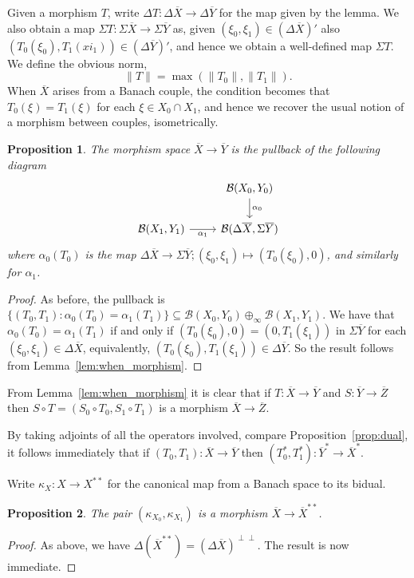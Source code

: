 \documentclass[a4paper,11pt]{article}
\theoremstyle{plain}
\newtheorem{proposition}{Proposition}[section]
\theoremstyle{remark}
\newcommand{\mc}[1]{\mathcal{#1}}
\begin{document}
Given a morphism $T$, write $\Delta T \colon \Delta\overline X \to \Delta\overline Y$ for the map given by the lemma.  We also obtain a map $\Sigma T \colon \Sigma\overline X \to \Sigma\overline Y$ as, given $(\xi_0,\xi_1) \in (\Delta\overline X)'$ also $(T_0(\xi_0), T_1(xi_1)) \in (\Delta\overline Y)'$, and hence we obtain a well-defined map $\Sigma T$.  We define the obvious norm,
\[ \|T\| = \max( \|T_0\|, \|T_1\| ). \]
When $\overline X$ arises from a Banach couple, the condition becomes that $T_0(\xi) = T_1(\xi)$ for each $\xi\in X_0 \cap X_1$, and hence we recover the usual notion of a morphism between couples, isometrically.

\begin{proposition}\label{prop:morphisms_as_pullback}
The morphism space $\overline X \to\overline Y$ is the pullback of the following diagram
\[ \begin{tikzcd}
  & \mc B(X_0, Y_0) \arrow[d, "\alpha_0"] \\
  \mc B(X_1,Y_1) \arrow[r, "\alpha_1"']  & \mc B(\Delta\overline X, \Sigma\overline Y)
\end{tikzcd} \]
where $\alpha_0(T_0)$ is the map $\Delta\overline X \to \Sigma\overline Y; (\xi_0,\xi_1) \mapsto (T_0(\xi_0), 0)$, and similarly for $\alpha_1$.
\end{proposition}
\begin{proof}
As before, the pullback is $\{ (T_0,T_1) : \alpha_0(T_0) = \alpha_1(T_1) \} \subseteq \mc B(X_0,Y_0) \oplus_\infty \mc B(X_1,Y_1)$.  We have that $\alpha_0(T_0) = \alpha_1(T_1)$ if and only if $(T_0(\xi_0),0) = (0,T_1(\xi_1))$ in $\Sigma\overline Y$ for each $(\xi_0,\xi_1)\in\Delta\overline X$, equivalently, $(T_0(\xi_0), T_1(\xi_1))\in\Delta\overline Y$.  So the result follows from Lemma~\ref{lem:when_morphism}.
\end{proof}

From Lemma~\ref{lem:when_morphism} it is clear that if $T\colon \overline X \to \overline Y$ and $S\colon \overline Y\to\overline Z$ then $S\circ T = (S_0\circ T_0, S_1\circ T_1)$ is a morphism $\overline X \to \overline Z$.

By taking adjoints of all the operators involved, compare Proposition~\ref{prop:dual}, it follows immediately that if $(T_0, T_1) \colon \overline X\to\overline Y$ then $(T_0^*, T_1^*) \colon \overline Y^* \to \overline X^*$.

Write $\kappa_X \colon X \to X^{**}$ for the canonical map from a Banach space to its bidual.

\begin{proposition}
The pair $(\kappa_{X_0}, \kappa_{X_1})$ is a morphism $\overline X \to \overline X^{**}$.
\end{proposition}
\begin{proof}
As above, we have $\Delta(\overline X^{**}) = (\Delta\overline X)^{\perp\perp}$.  The result is now immediate.
\end{proof}
\end{document}
